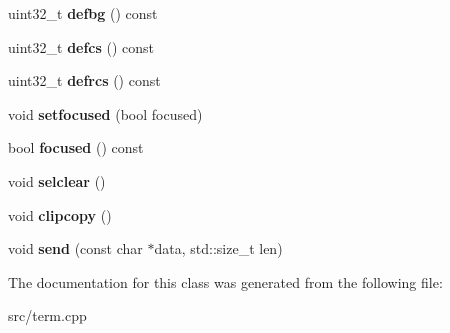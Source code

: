 \begin{DoxyCompactItemize}
uint32\+\_\+t {\bfseries defbg} () const
\item 
\mbox{\label{classterm_1_1TermImpl_af6dccce9ed22750d371f747e800a25af}} 
uint32\+\_\+t {\bfseries defcs} () const
\item 
\mbox{\label{classterm_1_1TermImpl_afbbc0b094a26031290a8afbdf6780f99}} 
uint32\+\_\+t {\bfseries defrcs} () const
\item 
\mbox{\label{classterm_1_1TermImpl_a5d84ac27a26b62e9889568d81ebc0edf}} 
void {\bfseries setfocused} (bool focused)
\item 
\mbox{\label{classterm_1_1TermImpl_ae3ff92d975b557f0897ff67d7a5f8a07}} 
bool {\bfseries focused} () const
\item 
\mbox{\label{classterm_1_1TermImpl_a185d4d80c9ffb588ede18490939b0e2a}} 
void {\bfseries selclear} ()
\item 
\mbox{\label{classterm_1_1TermImpl_a5b96429de317b98bc89c5b7230ad920d}} 
void {\bfseries clipcopy} ()
\item 
\mbox{\label{classterm_1_1TermImpl_a22cb2bcd745c998d79c00f936563a4c5}} 
void {\bfseries send} (const char $\ast$data, std\+::size\+\_\+t len)
\end{DoxyCompactItemize}


The documentation for this class was generated from the following file\+:\begin{DoxyCompactItemize}
\item 
src/term.\+cpp\end{DoxyCompactItemize}
